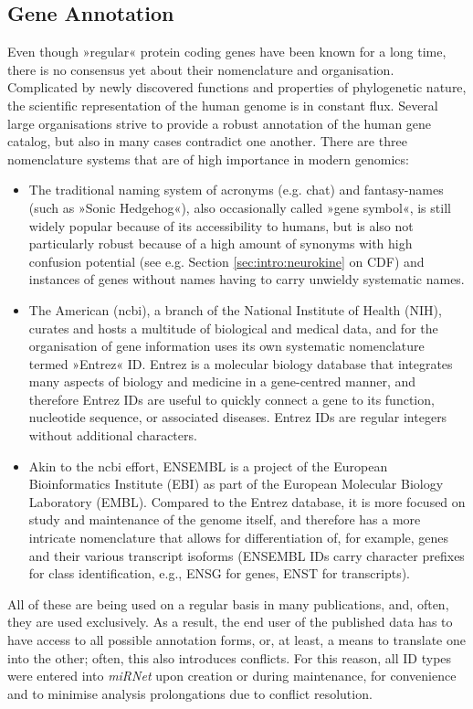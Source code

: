 \subsection{Gene Annotation}
Even though »regular« protein coding genes have been known for a long time, there is no consensus yet about their nomenclature and organisation. Complicated by newly discovered functions and properties of phylogenetic nature, the scientific representation of the human genome is in constant flux. Several large organisations strive to provide a robust annotation of the human gene catalog, but also in many cases contradict one another. There are three nomenclature systems that are of high importance in modern genomics: 
\begin{itemize}[noitemsep, leftmargin=.5cm, label={\tiny\raisebox{1ex}{\textbullet}}]
\item The traditional naming system of acronyms (e.g. \ac{chat}) and fantasy-names (such as »Sonic Hedgehog«), also occasionally called »gene symbol«, is still widely popular because of its accessibility to humans, but is also not particularly robust because of a high amount of synonyms with high confusion potential (see e.g. Section \ref{sec:intro:neurokine} on CDF) and instances of genes without names having to carry unwieldy systematic names.
\item The American (\ac{ncbi}), a branch of the National Institute of Health (NIH), curates and hosts a multitude of biological and medical data, and for the organisation of gene information uses its own systematic nomenclature termed »Entrez« ID. Entrez is a molecular biology database that integrates many aspects of biology and medicine in a gene-centred manner, and therefore Entrez IDs are useful to quickly connect a gene to its function, nucleotide sequence, or associated diseases. Entrez IDs are regular integers without additional characters.
\item Akin to the \ac{ncbi} effort, ENSEMBL is a project of the European Bioinformatics Institute (EBI) as part of the European Molecular Biology Laboratory (EMBL). Compared to the Entrez database, it is more focused on study and maintenance of the genome itself, and therefore has a more intricate nomenclature that allows for differentiation of, for example, genes and their various transcript isoforms (ENSEMBL IDs carry character prefixes for class identification, e.g., ENSG for genes, ENST for transcripts).
\end{itemize}
All of these are being used on a regular basis in many publications, and, often, they are used exclusively. As a result, the end user of the published data has to have access to all possible annotation forms, or, at least, a means to translate one into the other; often, this also introduces conflicts. For this reason, all ID types were entered into \textit{miRNet} upon creation or during maintenance, for convenience and to minimise analysis prolongations due to conflict resolution.

